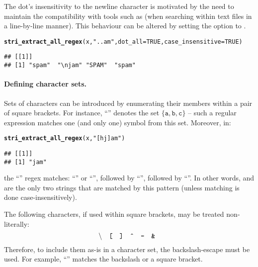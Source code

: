 \documentclass[nojss]{jss}\usepackage[]{graphicx}\usepackage[]{xcolor}
\makeatletter
\newcommand{\hlnum}[1]{\textcolor[rgb]{0.686,0.059,0.569}{#1}}%
\newcommand{\hlstr}[1]{\textcolor[rgb]{0.192,0.494,0.8}{#1}}%
\newcommand{\hlstd}[1]{\textcolor[rgb]{0.345,0.345,0.345}{#1}}%
\newcommand{\hlkwc}[1]{\textcolor[rgb]{0.333,0.667,0.333}{#1}}%
\newcommand{\hlkwd}[1]{\textcolor[rgb]{0.737,0.353,0.396}{\textbf{#1}}}%
\newenvironment{kframe}{%
 \def\at@end@of@kframe{}%
 \ifinner\ifhmode%
  \def\at@end@of@kframe{\end{minipage}}%
  \begin{minipage}{\columnwidth}%
 \fi\fi%
 \def\FrameCommand##1{\hskip\@totalleftmargin \hskip-\fboxsep
 \colorbox{shadecolor}{##1}\hskip-\fboxsep
     \hskip-\linewidth \hskip-\@totalleftmargin \hskip\columnwidth}%
 \MakeFramed {\advance\hsize-\width
   \@totalleftmargin\z@ \linewidth\hsize
   \@setminipage}}%
 {\par\unskip\endMakeFramed%
 \at@end@of@kframe}
\newenvironment{knitrout}{}{} %
\makeatother
\begin{document}
The dot's insensitivity to the newline character is motivated
by the need to maintain the compatibility with tools such as 
(when searching within text files in a line-by-line manner).
This behaviour can be altered by setting the  option to .

\begin{knitrout}
\color{fgcolor}\begin{kframe}
\begin{alltt}
\hlkwd{stri_extract_all_regex}\hlstd{(x,} \hlstr{"..am"}\hlstd{,} \hlkwc{dot_all}\hlstd{=}\hlnum{TRUE}\hlstd{,} \hlkwc{case_insensitive}\hlstd{=}\hlnum{TRUE}\hlstd{)}
\end{alltt}
\begin{verbatim}
## [[1]]
## [1] "spam"  "\njam" "SPAM"  "spam"
\end{verbatim}
\end{kframe}
\end{knitrout}



\paragraph{Defining character sets.}
Sets of characters can be introduced by enumerating
their members within a pair of
square brackets.
For instance, ``\code{[abc]}'' denotes the set $\{\mathtt{a},\mathtt{b},\mathtt{c}\}$
-- such a regular expression matches one (and only one) symbol from this set.
Moreover, in:


\begin{knitrout}
\color{fgcolor}\begin{kframe}
\begin{alltt}
\hlkwd{stri_extract_all_regex}\hlstd{(x,} \hlstr{"[hj]am"}\hlstd{)}
\end{alltt}
\begin{verbatim}
## [[1]]
## [1] "jam"
\end{verbatim}
\end{kframe}
\end{knitrout}


\noindent
the ``'' regex matches:
``'' or ``'', followed by ``'', followed by ``''.
In other words,  and 
are the only two strings that are matched by this pattern
(unless matching is done case-insensitively).


The following characters, if used within square brackets, may be treated
non-literally:
\[
\text{
  \textbackslash{}\quad
  \texttt{[}\quad
  \texttt{]}\quad
  \texttt{\^{}}\quad
  \texttt{{}-{}}\quad
  \texttt{\&}\quad
}
\]
Therefore, to include them as-is in a character set, the
backslash-escape must be used.
For example, ``\code{[\textbackslash[\textbackslash]\textbackslash\textbackslash]}'' matches
the backslash or a square bracket.
\end{document}
